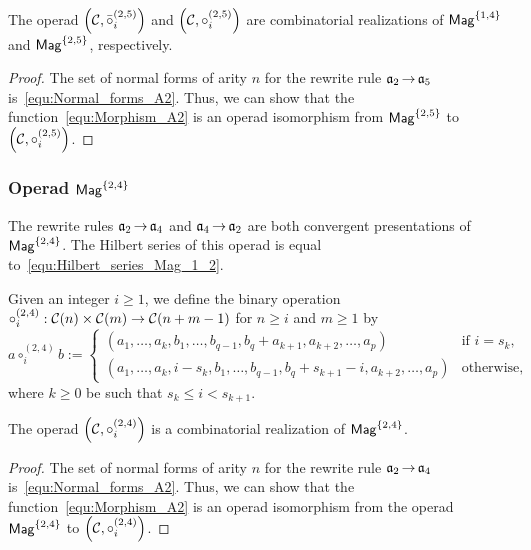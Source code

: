 \begin{Proposition} \label{prop:Realisation_Mag_1_4}
The operad
$\left(\mathcal{C}, \bar{\circ}_i^{(2,5)}\right)$ and
$\left(\mathcal{C}, \circ_i^{(2,5)}\right)$
are combinatorial realizations of $\mathsf{Mag}^{\{1, 4\}}$ and 
$\mathsf{Mag}^{\{2, 5\}}$, respectively.
\end{Proposition}

\begin{proof}
The set of normal forms of arity $n$ for the rewrite rule
$\mathfrak{a}_2 \operatorname{\to} \mathfrak{a}_5$ is~\eqref{equ:Normal_forms_A2}. Thus, we can show
that the function~\eqref{equ:Morphism_A2} is an operad isomorphism from
$\mathsf{Mag}^{\{2, 5\}}$ to
$\left(\mathcal{C}, \circ_i^{(2,5)}\right)$.
\end{proof}
\medbreak

\subsubsection{Operad $\mathsf{Mag}^{\{2, 4\}}$}
The rewrite rules $\mathfrak{a}_2 \operatorname{\to} \mathfrak{a}_4$ and $\mathfrak{a}_4 \operatorname{\to} \mathfrak{a}_2$ are both
convergent presentations of $\mathsf{Mag}^{\{2, 4\}}$. The Hilbert series of
this operad is equal to~\eqref{equ:Hilbert_series_Mag_1_2}.
\medbreak

Given an integer $i \geq 1$, we define the
binary operation
$\circ_i^{(2,4)} : \mathcal{C}(n) \times \mathcal{C}(m)\rightarrow
 \mathcal{C}(n + m - 1)$ for
$n \geq i$ and $m \geq 1$ by
\begin{equation}
    a \circ_i^{(2,4)} b :=
    \begin{cases}
    (a_1, \dots, a_{k}, b_1, \dots, b_{q-1}, b_{q} + a_{k+1},
    a_{k+2}, \dots ,a_{p}) & \mbox{if } i = s_k, \\
    (a_1, \dots, a_{k}, i - s_{k}, b_1, \dots, b_{q-1}, b_{q}
     + s_{k+1} - i, a_{k+2}, \dots ,a_{p}) & \mbox{otherwise},
    \end{cases}
\end{equation}
where $k \geq 0$  be such that $s_k \leq i < s_{k+1}$.
\medbreak

\begin{Proposition} \label{prop:Realisation_Mag_2_4}
The operad
$\left(\mathcal{C}, \circ_i^{(2,4)}\right)$
is a combinatorial realization of $\mathsf{Mag}^{\{2, 4\}}$.
\end{Proposition}

\begin{proof}
The set of normal forms of arity $n$ for the rewrite rule
$\mathfrak{a}_2 \operatorname{\to} \mathfrak{a}_4$ is~\eqref{equ:Normal_forms_A2}. Thus, we can show
that the function~\eqref{equ:Morphism_A2} is an operad isomorphism from
the operad $\mathsf{Mag}^{\{2, 4\}}$ to
$\left(\mathcal{C}, \circ_i^{(2,4)}\right)$.
\end{proof}
\medbreak

